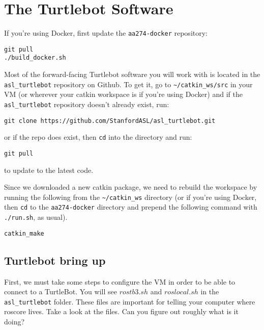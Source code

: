 \section{The Turtlebot Software}

If you're using Docker, first update the \texttt{aa274-docker} repository:

\begin{lstlisting}
git pull
./build_docker.sh
\end{lstlisting}

Most of the forward-facing Turtlebot software you will work with is located in the \texttt{asl\_turtlebot} repository on Github. To get it, go to \texttt{\textasciitilde/catkin\_ws/src} in your VM (or wherever your catkin workspace is if you're using Docker) and if the \texttt{asl\_turtlebot} repository doesn't already exist, run:

\begin{lstlisting}
git clone https://github.com/StanfordASL/asl_turtlebot.git
\end{lstlisting}

or if the repo does exist, then \texttt{cd} into the directory and run:

\begin{lstlisting}
git pull
\end{lstlisting}

to update to the latest code.

Since we downloaded a new catkin package, we need to rebuild the workspace by running the following from the \texttt{\textasciitilde/catkin\_ws} directory (or if you're using Docker, then \texttt{cd} to the \texttt{aa274-docker} directory and prepend the following command with \texttt{./run.sh}, as usual).

\begin{lstlisting}
catkin_make
\end{lstlisting}

\subsection{Turtlebot bring up}
First, we must take some steps to configure the VM in order to be able to connect to a TurtleBot. You will see $rostb3.sh$ and $roslocal.sh$ in the \texttt{asl\_turtlebot} folder. These files are important for telling your computer where roscore lives. Take a look at the files. Can you figure out roughly what is it doing?

